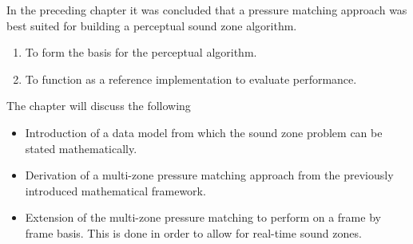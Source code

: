 In the preceding chapter it was concluded that a pressure matching approach was best suited for building a perceptual sound zone algorithm.
\begin{enumerate}
    \item To form the basis for the perceptual algorithm.
    \item To function as a reference implementation to evaluate performance.
\end{enumerate}

The chapter will discuss the following
\begin{itemize}
    \item Introduction of a data model from which the sound zone problem can be stated mathematically.
    \item Derivation of a multi-zone pressure matching approach from the previously introduced mathematical framework. 
    \item Extension of the multi-zone pressure matching to perform on a frame by frame basis.
        This is done in order to allow for real-time sound zones.
\end{itemize}

